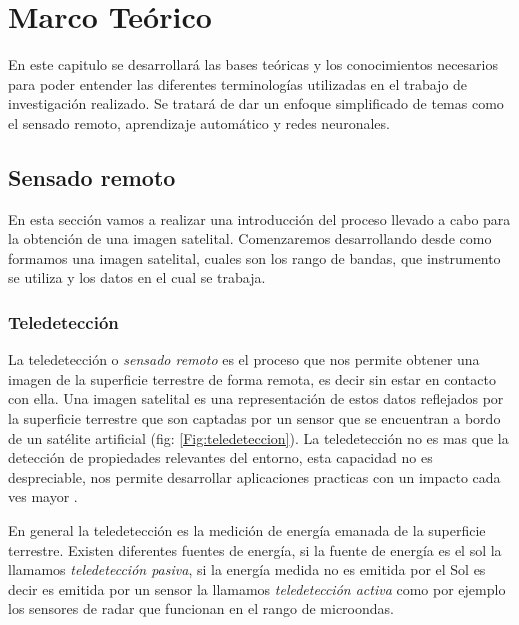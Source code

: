 \chapter{Marco Teórico} \label{chap:marcoteorico}

En este capitulo se desarrollará las bases teóricas y los conocimientos necesarios para poder entender las diferentes terminologías utilizadas en el trabajo de investigación realizado. Se tratará de dar un enfoque simplificado de temas como el sensado remoto,  aprendizaje automático y redes neuronales.

\section{Sensado remoto}\label{sec:sensadoremoto}

En esta sección vamos a realizar una introducción del proceso llevado a cabo para la obtención de una imagen satelital. Comenzaremos desarrollando desde como formamos una imagen satelital, cuales son los rango de bandas, que instrumento se utiliza y los datos en el cual se trabaja.

\subsection{Teledetección}\label{sub:teledeteccion}

La teledetección o \textit{sensado remoto} es el proceso que nos permite obtener una imagen de la superficie terrestre de forma remota, es decir sin estar en contacto con ella. Una imagen satelital es una representación de estos datos reflejados por la superficie terrestre que son captadas por un sensor que se encuentran a bordo de un satélite artificial (fig: \ref{Fig:teledeteccion}). La teledetección no es mas que la detección de propiedades relevantes del entorno, esta capacidad no es despreciable, nos permite desarrollar aplicaciones practicas con un impacto cada ves mayor \citep{percepcion}.

En general la teledetección es la medición de energía emanada de la superficie terrestre. Existen diferentes fuentes de energía, si la fuente de energía es el sol la llamamos \textit{teledetección pasiva}, si la energía medida no es emitida por el Sol es decir es emitida por un sensor la llamamos \textit{teledetección activa} como por ejemplo los sensores de radar que funcionan en el rango de microondas.

